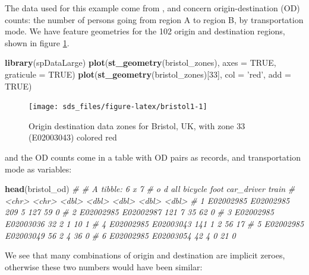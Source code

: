 \documentclass[]{book}
\newenvironment{Shaded}{\begin{snugshade}}{\end{snugshade}}
\newcommand{\CommentTok}[1]{\textcolor[rgb]{0.56,0.35,0.01}{\textit{#1}}}
\newcommand{\DataTypeTok}[1]{\textcolor[rgb]{0.13,0.29,0.53}{#1}}
\newcommand{\DecValTok}[1]{\textcolor[rgb]{0.00,0.00,0.81}{#1}}
\newcommand{\KeywordTok}[1]{\textcolor[rgb]{0.13,0.29,0.53}{\textbf{#1}}}
\newcommand{\NormalTok}[1]{#1}
\newcommand{\OtherTok}[1]{\textcolor[rgb]{0.56,0.35,0.01}{#1}}
\newcommand{\StringTok}[1]{\textcolor[rgb]{0.31,0.60,0.02}{#1}}
\begin{document}
The data used for this example come from \citep{geocomp}, and concern
origin-destination (OD) counts: the number of persons going from
region A to region B, by transportation mode. We have feature
geometries for the 102 origin and destination regions, shown in figure \ref{fig:bristol1}.

\begin{Shaded}
\begin{Highlighting}[]
\KeywordTok{library}\NormalTok{(spDataLarge)}
\KeywordTok{plot}\NormalTok{(}\KeywordTok{st_geometry}\NormalTok{(bristol_zones), }\DataTypeTok{axes =} \OtherTok{TRUE}\NormalTok{, }\DataTypeTok{graticule =} \OtherTok{TRUE}\NormalTok{)}
\KeywordTok{plot}\NormalTok{(}\KeywordTok{st_geometry}\NormalTok{(bristol_zones)[}\DecValTok{33}\NormalTok{], }\DataTypeTok{col =} \StringTok{'red'}\NormalTok{, }\DataTypeTok{add =} \OtherTok{TRUE}\NormalTok{)}
\end{Highlighting}
\end{Shaded}

\begin{figure}

{\centering \texttt{[image: sds\_files/figure-latex/bristol1-1]} 

}

\caption{Origin destination data zones for Bristol, UK, with zone 33 (E02003043) colored red}\label{fig:bristol1}
\end{figure}

and the OD counts come in a table
with OD pairs as records, and transportation mode as variables:

\begin{Shaded}
\begin{Highlighting}[]
\KeywordTok{head}\NormalTok{(bristol_od)}
\CommentTok{# # A tibble: 6 x 7}
\CommentTok{#   o         d           all bicycle  foot car_driver train}
\CommentTok{#   <chr>     <chr>     <dbl>   <dbl> <dbl>      <dbl> <dbl>}
\CommentTok{# 1 E02002985 E02002985   209       5   127         59     0}
\CommentTok{# 2 E02002985 E02002987   121       7    35         62     0}
\CommentTok{# 3 E02002985 E02003036    32       2     1         10     1}
\CommentTok{# 4 E02002985 E02003043   141       1     2         56    17}
\CommentTok{# 5 E02002985 E02003049    56       2     4         36     0}
\CommentTok{# 6 E02002985 E02003054    42       4     0         21     0}
\end{Highlighting}
\end{Shaded}

We see that many combinations of origin and destination are implicit
zeroes, otherwise these two numbers would have been similar:
\end{document}

